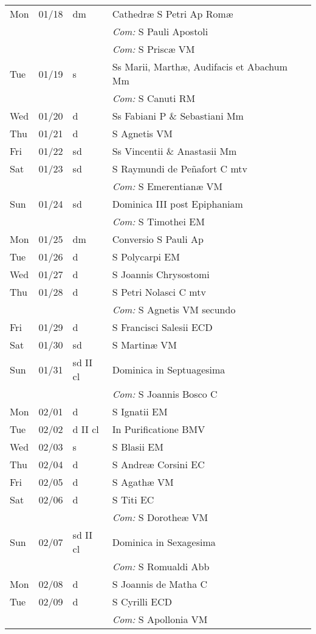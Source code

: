 \documentclass[10pt]{article}
\begin{document}
\begin{longtable}{ l l l l }
Mon & 01/18 & dm & Cathedræ S Petri Ap Romæ\\
 & & & \textit{Com:} S Pauli Apostoli\\
 & & & \textit{Com:} S Priscæ VM\\
Tue & 01/19 & s & Ss Marii, Marthæ, Audifacis et Abachum Mm\\
 & & & \textit{Com:} S Canuti RM\\
Wed & 01/20 & d & Ss Fabiani P \& Sebastiani Mm\\
Thu & 01/21 & d & S Agnetis VM\\
Fri & 01/22 & sd & Ss Vincentii \& Anastasii Mm\\
Sat & 01/23 & sd & S Raymundi de Peñafort C mtv\\
 & & & \textit{Com:} S Emerentianæ VM\\
Sun & 01/24 & sd & Dominica III post Epiphaniam\\
 & & & \textit{Com:} S Timothei EM\\
Mon & 01/25 & dm & Conversio S Pauli Ap\\
Tue & 01/26 & d & S Polycarpi EM\\
Wed & 01/27 & d & S Joannis Chrysostomi\\
Thu & 01/28 & d & S Petri Nolasci C mtv\\
 & & & \textit{Com:} S Agnetis VM secundo\\
Fri & 01/29 & d & S Francisci Salesii ECD\\
Sat & 01/30 & sd & S Martinæ VM\\
Sun & 01/31 & sd II cl & Dominica in Septuagesima\\
 & & & \textit{Com:} S Joannis Bosco C\\
Mon & 02/01 & d & S Ignatii EM\\
Tue & 02/02 & d II cl & In Purificatione BMV\\
Wed & 02/03 & s & S Blasii EM\\
Thu & 02/04 & d & S Andreæ Corsini EC\\
Fri & 02/05 & d & S Agathæ VM\\
Sat & 02/06 & d & S Titi EC\\
 & & & \textit{Com:} S Dorotheæ VM\\
Sun & 02/07 & sd II cl & Dominica in Sexagesima\\
 & & & \textit{Com:} S Romualdi Abb\\
Mon & 02/08 & d & S Joannis de Matha C\\
Tue & 02/09 & d & S Cyrilli ECD\\
 & & & \textit{Com:} S Apollonia VM\\

\end{longtable}
\end{document}
